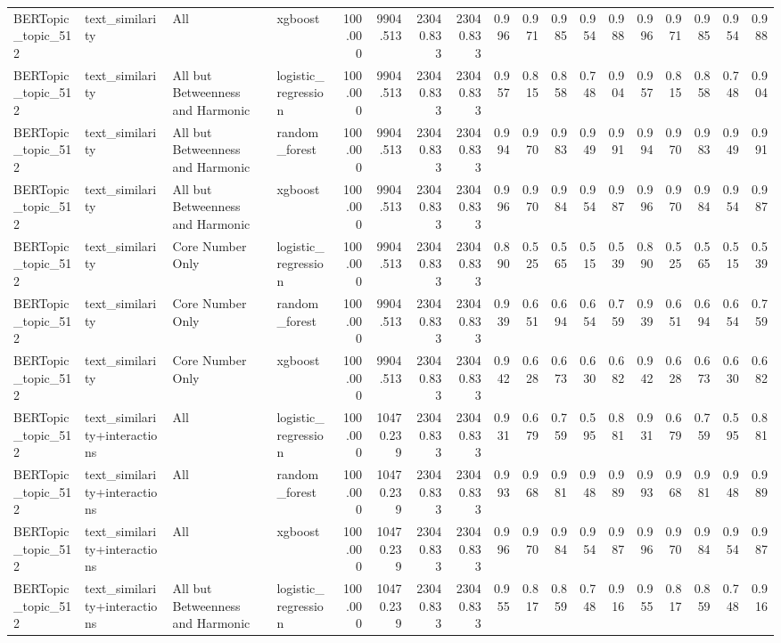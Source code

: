 \begin{tabular}{llllrrrrrrrrrrrrrr}
BERTopic\_topic\_512 & text\_similarity & All & xgboost & 100.000 & 9904.513 & 23040.833 & 23040.833 & 0.996 & 0.971 & 0.985 & 0.954 & 0.988 & 0.996 & 0.971 & 0.985 & 0.954 & 0.988 \\
BERTopic\_topic\_512 & text\_similarity & All but Betweenness and Harmonic & logistic\_regression & 100.000 & 9904.513 & 23040.833 & 23040.833 & 0.957 & 0.815 & 0.858 & 0.748 & 0.904 & 0.957 & 0.815 & 0.858 & 0.748 & 0.904 \\
BERTopic\_topic\_512 & text\_similarity & All but Betweenness and Harmonic & random\_forest & 100.000 & 9904.513 & 23040.833 & 23040.833 & 0.994 & 0.970 & 0.983 & 0.949 & 0.991 & 0.994 & 0.970 & 0.983 & 0.949 & 0.991 \\
BERTopic\_topic\_512 & text\_similarity & All but Betweenness and Harmonic & xgboost & 100.000 & 9904.513 & 23040.833 & 23040.833 & 0.996 & 0.970 & 0.984 & 0.954 & 0.987 & 0.996 & 0.970 & 0.984 & 0.954 & 0.987 \\
BERTopic\_topic\_512 & text\_similarity & Core Number Only & logistic\_regression & 100.000 & 9904.513 & 23040.833 & 23040.833 & 0.890 & 0.525 & 0.565 & 0.515 & 0.539 & 0.890 & 0.525 & 0.565 & 0.515 & 0.539 \\
BERTopic\_topic\_512 & text\_similarity & Core Number Only & random\_forest & 100.000 & 9904.513 & 23040.833 & 23040.833 & 0.939 & 0.651 & 0.694 & 0.654 & 0.759 & 0.939 & 0.651 & 0.694 & 0.654 & 0.759 \\
BERTopic\_topic\_512 & text\_similarity & Core Number Only & xgboost & 100.000 & 9904.513 & 23040.833 & 23040.833 & 0.942 & 0.628 & 0.673 & 0.630 & 0.682 & 0.942 & 0.628 & 0.673 & 0.630 & 0.682 \\
BERTopic\_topic\_512 & text\_similarity+interactions & All & logistic\_regression & 100.000 & 10470.239 & 23040.833 & 23040.833 & 0.931 & 0.679 & 0.759 & 0.595 & 0.881 & 0.931 & 0.679 & 0.759 & 0.595 & 0.881 \\
BERTopic\_topic\_512 & text\_similarity+interactions & All & random\_forest & 100.000 & 10470.239 & 23040.833 & 23040.833 & 0.993 & 0.968 & 0.981 & 0.948 & 0.989 & 0.993 & 0.968 & 0.981 & 0.948 & 0.989 \\
BERTopic\_topic\_512 & text\_similarity+interactions & All & xgboost & 100.000 & 10470.239 & 23040.833 & 23040.833 & 0.996 & 0.970 & 0.984 & 0.954 & 0.987 & 0.996 & 0.970 & 0.984 & 0.954 & 0.987 \\
BERTopic\_topic\_512 & text\_similarity+interactions & All but Betweenness and Harmonic & logistic\_regression & 100.000 & 10470.239 & 23040.833 & 23040.833 & 0.955 & 0.817 & 0.859 & 0.748 & 0.916 & 0.955 & 0.817 & 0.859 & 0.748 & 0.916 \\

\end{tabular}
